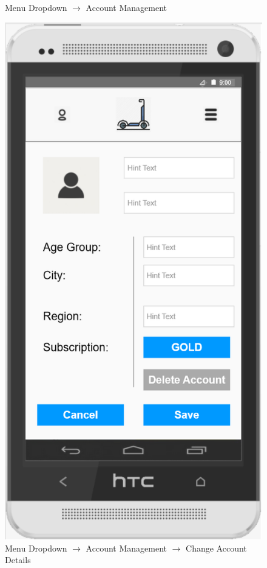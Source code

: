 \documentclass[a4paper, 12pt]{article}
\begin{document}
\begin{figure} [htbp]
\begin{center}
\begin{minipage}{0.45\textwidth}
\begin{center}
            \end{center}
            \caption{Menu Dropdown $\rightarrow$ Account Management}
        \end{minipage}\hfill
        \begin{minipage}{0.45\textwidth}
            \begin{center}
                \includegraphics[scale=0.65]{images/prototypes/02-01-01-menu-dropdown--account-management--change-account-details.png}
            \end{center}
            \caption{Menu Dropdown $\rightarrow$ Account Management $\rightarrow$ Change Account Details}
        \end{minipage}
    \end{center}
\end{figure}
\end{document}
